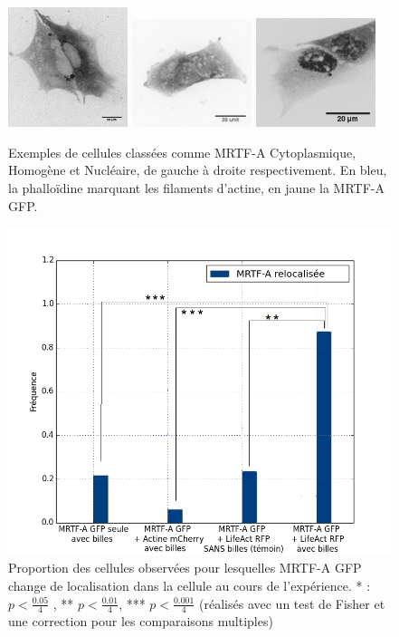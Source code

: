 \documentclass                                                                                                                                                                                                                                                                                                                                       {report}
\begin{document}
  \begin{figure}[p]
  \includegraphics[width=3.5cm]{Figures/Exemple_C_GFP_impress.png} 
 \includegraphics[width=3.5cm]{Figures/Exemple_H_GFP_impress.png} 
 \includegraphics[width=3.5cm]{Figures/Exemple_N_2_GFP_impress.png} 
 \caption{Exemples de cellules classées comme MRTF-A Cytoplasmique, Homogène et Nucléaire, de gauche à droite respectivement. En bleu, la phalloïdine marquant les filaments d'actine, en jaune la MRTF-A GFP.\label{Exemples_CHN}}

 \end{figure}
 
 \begin{figure}[p]
\includegraphics[scale=0.4]{Figures/Pinces_MRTFA_stars_colors.png} 
\caption{Proportion des cellules observées pour lesquelles MRTF-A GFP change de localisation dans la cellule au cours de l'expérience. * : $p<\frac{0.05}{4}$ , ** $p<\frac{0.01}{4}$, *** $p<\frac{0.001}{4}$ (réalisés avec un test de Fisher et une correction pour les comparaisons multiples)\label{MRTF-A Pinces}}
\end{figure}
\end{document}
